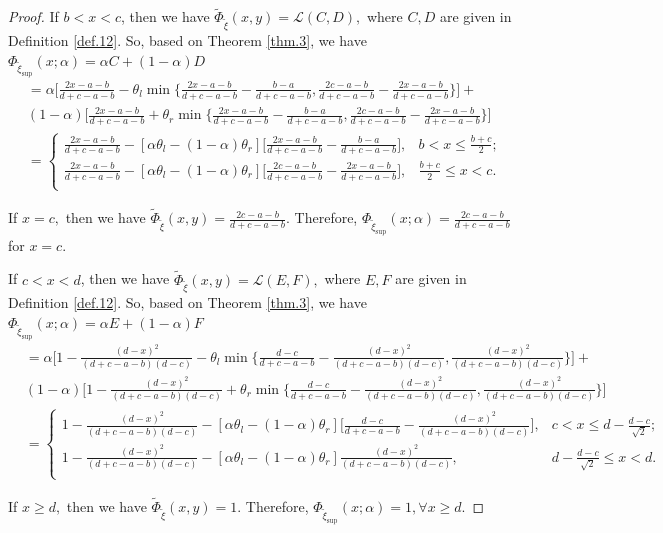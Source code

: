 \begin{proof}
	\par If $b< x< c$, then we have $\tilde{\Phi}_{\tilde{\xi}}(x,y)=\mathcal{L}(C,D),$ where $C,D$ are given in Definition \ref{def.12}. So, based on Theorem \ref{thm.3}, we have $	\Phi_{\tilde{\xi}_{\sup}}(x;\alpha)=\alpha C+(1-\alpha)D$
	\begin{equation*} 
		\begin{aligned}
			&=\alpha \bigg[\frac{2x-a-b}{d+c-a-b}-\theta_l\min\bigg\{\frac{2x-a-b}{d+c-a-b}-\frac{b-a}{d+c-a-b},\frac{2c-a-b}{d+c-a-b}-\frac{2x-a-b}{d+c-a-b}\bigg\}\bigg]+\\
			&(1-\alpha)\bigg[\frac{2x-a-b}{d+c-a-b}+\theta_r\min\bigg\{\frac{2x-a-b}{d+c-a-b}-\frac{b-a}{d+c-a-b},\frac{2c-a-b}{d+c-a-b}-\frac{2x-a-b}{d+c-a-b}\bigg\}\bigg]\\
			& =\left\{
			\begin{array}{ll}
				\frac{2x-a-b}{d+c-a-b}-[\alpha\theta_l-(1-\alpha)\theta_r]\big[\frac{2x-a-b}{d+c-a-b}-\frac{b-a}{d+c-a-b}\big], & b<x\leq \frac{b+c}{2};\\
				\frac{2x-a-b}{d+c-a-b}-[\alpha\theta_l-(1-\alpha)\theta_r]\big[\frac{2c-a-b}{d+c-a-b}-\frac{2x-a-b}{d+c-a-b}\big], &  \frac{b+c}{2}\leq x<c.\\
			\end{array}
			\right.
		\end{aligned}
	\end{equation*}
\par If $x=c,$ then we have $\tilde{\Phi}_{\tilde{\xi}}(x,y)=\frac{2c-a-b}{d+c-a-b}.$ Therefore, $\Phi_{\tilde{\xi}_{\sup}}(x;\alpha)=\frac{2c-a-b}{d+c-a-b}$ for $x=c.$
\par If $c< x< d$, then we have $\tilde{\Phi}_{\tilde{\xi}}(x,y)=\mathcal{L}(E,F),$ where $E,F$ are given in Definition \ref{def.12}. So, based on Theorem \ref{thm.3}, we have $\Phi_{\tilde{\xi}_{\sup}}(x;\alpha)=\alpha E+(1-\alpha)F$
\begin{equation*} 
	\begin{aligned}
		&=\alpha \bigg[1-\frac{(d-x)^2}{(d+c-a-b)(d-c)}-\theta_l\min\bigg\{\frac{d-c}{d+c-a-b}-\frac{(d-x)^2}{(d+c-a-b)(d-c)},\frac{(d-x)^2}{(d+c-a-b)(d-c)}\bigg\}\bigg]+\\
		&(1-\alpha)\bigg[1-\frac{(d-x)^2}{(d+c-a-b)(d-c)}+\theta_r\min\bigg\{\frac{d-c}{d+c-a-b}-\frac{(d-x)^2}{(d+c-a-b)(d-c)},\frac{(d-x)^2}{(d+c-a-b)(d-c)}\bigg\}\bigg]\\
		& =\left\{
		\begin{array}{ll}
			1-\frac{(d-x)^2}{(d+c-a-b)(d-c)}-[\alpha\theta_l-(1-\alpha)\theta_r]\big[\frac{d-c}{d+c-a-b}-\frac{(d-x)^2}{(d+c-a-b)(d-c)}\big], & c<x\leq d-\frac{d-c}{\sqrt{2}};\\
			1-\frac{(d-x)^2}{(d+c-a-b)(d-c)}-[\alpha\theta_l-(1-\alpha)\theta_r]\frac{(d-x)^2}{(d+c-a-b)(d-c)}, & d-\frac{d-c}{\sqrt{2}}\leq x<d.\\
		\end{array}
		\right.
	\end{aligned}
\end{equation*}
	\par 	If $x\geq d,$ then we have $\tilde{\Phi}_{\tilde{\xi}}(x,y)=1.$ Therefore, $\Phi_{\tilde{\xi}_{\sup}}(x;\alpha)=1, \forall x\geq d.$
\end{proof}
